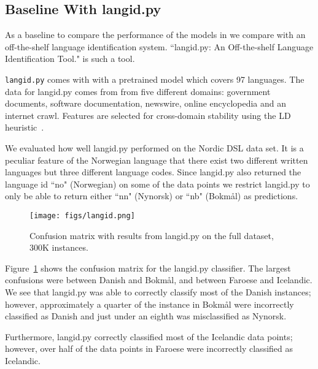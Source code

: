 \documentclass[11pt,a4paper]{article}
\begin{document}
\subsection{Baseline With langid.py}

As a baseline to compare the performance of the models in we compare with an off-the-shelf language identification system. ``langid.py: An Off-the-shelf Language Identification Tool." \cite{langID} is such a tool.

{\tt langid.py} comes with with a pretrained model which covers 97 languages. The data for langid.py comes from from five different domains: government documents, software documentation, newswire, online encyclopedia and an internet crawl. Features are selected for cross-domain stability using the LD heuristic~\cite{lui2011cross}.

We evaluated how well langid.py performed on the Nordic DSL data set. It is a peculiar feature of the Norwegian language that there exist two different written languages but three different language codes. Since langid.py also returned the language id ``no" (Norwegian) on some of the data points we restrict langid.py to only be able to return either ``nn" (Nynorsk) or ``nb" (Bokmål) as predictions.

\begin{figure}
  \centering
  \texttt{[image: figs/langid.png]}
  \caption{Confusion matrix with results from langid.py on the full dataset, 300K instances.}
  \label{langid_confusion_matrix}
\end{figure}

Figure~\ref{langid_confusion_matrix} shows the confusion matrix for the langid.py classifier. The largest confusions were between Danish and Bokmål, and between Faroese and Icelandic. We see that langid.py was able to correctly classify most of the Danish instances; however, approximately a quarter of the instance in Bokmål were incorrectly classified as Danish and just under an eighth was misclassified as Nynorsk.

Furthermore, langid.py correctly classified most of the Icelandic data points; however, over half of the data points in Faroese were incorrectly classified as Icelandic.
\end{document}
